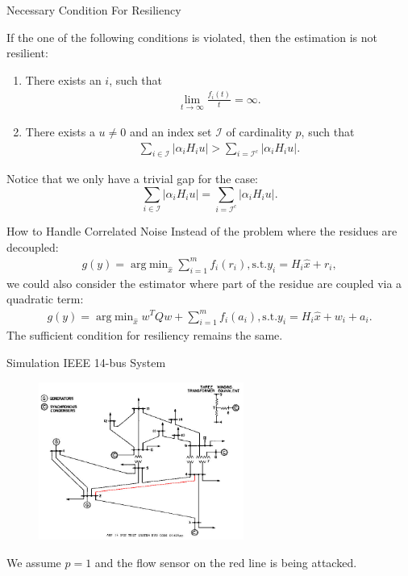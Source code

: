 \documentclass[10pt]{beamer}
\DeclareMathOperator{\argmin}{arg\;min}
\begin{document}
\begin{frame}{Necessary Condition For Resiliency}
  \begin{theorem}
    If the one of the following conditions is violated, then the estimation is not resilient:
    \begin{enumerate}
    \item There exists an $i$, such that
      \begin{align*}
        \lim_{t\rightarrow\infty}\frac{f_i(t)}{t} = \infty.
      \end{align*}
    \item There exists a $u\neq 0$ and an index set $\mathcal I$ of cardinality $p$, such that
      \begin{align*}
        \sum_{i\in \mathcal I} |\alpha_i H_i u| > \sum_{i=\mathcal I^c} |\alpha_i H_i u|.
      \end{align*}
    \end{enumerate}
  \end{theorem}
  Notice that we only have a trivial gap for the case:
  \[ \sum_{i\in \mathcal I} |\alpha_i H_i u| = \sum_{i=\mathcal I^c} |\alpha_i H_i u|.\]
\end{frame}

\begin{frame}{How to Handle Correlated Noise}
  Instead of the problem where the residues are decoupled:
  \begin{align*}
    g(y) = \argmin_{\hat x} \sum_{i=1}^m f_i(r_i),\text{s.t.}y_i = H_i\hat x+r_i,
  \end{align*}
  we could also consider the estimator where part of the residue are coupled via a quadratic term:
  \begin{align*}
    g(y) = \argmin_{\hat x}  w^TQw+\sum_{i=1}^m f_i(a_i),\text{s.t.}y_i = H_i\hat x+w_i+a_i.
  \end{align*}
  The sufficient condition for resiliency remains the same.
\end{frame}

\begin{frame}{Simulation IEEE 14-bus System}
  \begin{figure}[ht]
    \centering
    \includegraphics[width=0.60\textwidth]{ieee14.jpg}
  \end{figure}
  We assume $p=1$ and the flow sensor on the red line is being attacked.
\end{frame}
\end{document}
